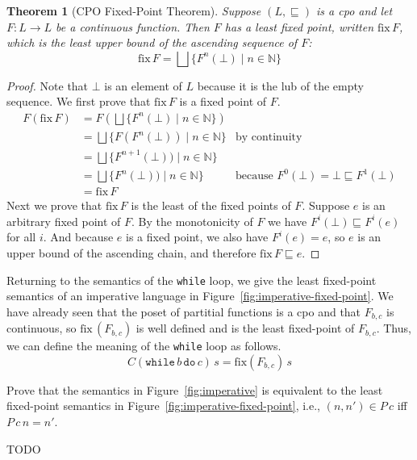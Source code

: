 \documentclass{tufte-handout}
\newcommand{\WHILE}[2]{\mathtt{while}\,#1\,\mathtt{do}\,#2}
\newcommand{\NAT}[0]{\mathbb{N}}
\newtheorem{theorem}{Theorem}%
\begin{document}
\begin{theorem}[CPO Fixed-Point Theorem]\label{thm:fixed-point}
Suppose $(L,\sqsubseteq)$ is a cpo and let $F:L\to L$ be a continuous
function. Then $F$ has a least fixed point, written $\mathrm{fix}\,F$,
which is the least upper bound of the ascending sequence of $F$:
\[
  \mathrm{fix}\,F = \bigsqcup \{ F^n(\bot) \mid n \in \NAT \}
\]
\end{theorem}
\begin{proof}
Note that $\bot$ is an element of $L$ because it is the lub of the
empty sequence.  We first prove that $\mathrm{fix}\,F$ is a fixed
point of $F$.
\begin{align*}
  F(\mathrm{fix}\,F) &= F(\bigsqcup \{ F^n(\bot) \mid n \in \NAT \})\\
  &= \bigsqcup\{ F(F^n(\bot)) \mid n \in \NAT \} & \text{by continuity}\\
  &= \bigsqcup\{ F^{n+1}(\bot)) \mid n \in \NAT \} \\
  &= \bigsqcup\{ F^n(\bot)) \mid n \in \NAT \} 
  & \text{because } F^0(\bot) = \bot \sqsubseteq F^1(\bot)  \\
  &= \mathrm{fix}\,F
\end{align*}
Next we prove that $\mathrm{fix}\,F$ is the least of the fixed points
of $F$. Suppose $e$ is an arbitrary fixed point of $F$. By the
monotonicity of $F$ we have $F^i(\bot) \sqsubseteq F^i(e)$ for all
$i$.  And because $e$ is a fixed point, we also have $F^i(e) = e$, so
$e$ is an upper bound of the ascending chain, and therefore
$\mathrm{fix}\,F \sqsubseteq e$.
\end{proof}


Returning to the semantics of the \texttt{while} loop, we give the
least fixed-point semantics of an imperative language in
Figure~\ref{fig:imperative-fixed-point}. We have already seen that the
poset of partitial functions is a cpo and that $F_{b,c}$ is
continuous, so $\mathrm{fix}\,(F_{b,c})$ is well defined and is the
least fixed-point of $F_{b,c}$. Thus, we can define the meaning
of the \texttt{while} loop as follows.
\[
  C(\WHILE{b}{c})\,s = \mathrm{fix}(F_{b,c})\,s
\]

\begin{Exercise}
  Prove that the semantics in Figure~\ref{fig:imperative} is
  equivalent to the least fixed-point semantics in
  Figure~\ref{fig:imperative-fixed-point}, i.e., $(n,n') \in P\,c$ iff
  $P\,c\,n = n'$.
\end{Exercise}
\begin{Answer}
TODO
\end{Answer}
\end{document}
